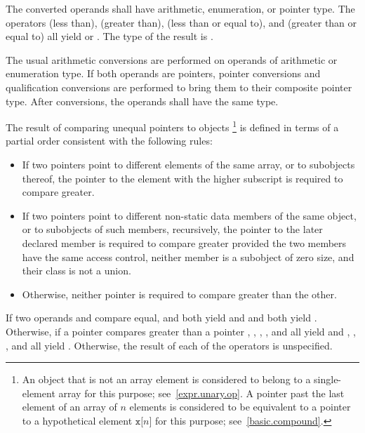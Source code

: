 \pnum
The converted operands shall have arithmetic, enumeration, or pointer type.
The
operators \tcode{<} (less than), \tcode{>} (greater than), \tcode{<=}
(less than or equal to), and \tcode{>=} (greater than or equal to) all
yield  or . The type of the result is
.

\pnum
The usual arithmetic conversions are performed on operands of arithmetic
or enumeration type. If both operands are pointers, pointer
conversions and qualification conversions
are performed to bring
them to their composite pointer type.
After conversions, the operands shall have the same type.

\pnum
The result of comparing unequal pointers to objects%
\footnote{An object that is not an array element is considered to belong to a
single-element array for this purpose; see~\ref{expr.unary.op}.
A pointer past the last element of an array  of $n$ elements
is considered to be equivalent to a pointer to a hypothetical element
$\mathtt{x[}n\mathtt{]}$ for this purpose; see~\ref{basic.compound}.}
is defined in terms of a partial order consistent with the following rules:

\begin{itemize}
\item If two pointers point to different elements of the same array, or to
subobjects thereof, the pointer to the element with the higher subscript
is required to compare greater.

\item If two pointers point to different non-static data members of the same
object, or to subobjects of such members, recursively,
the pointer to the later declared member is required to compare greater provided
the two members have the same access control,
neither member is a subobject of zero size,
and their class is not a union.

\item Otherwise, neither pointer is required to compare greater than the other.

\end{itemize}

\pnum
If two operands  and  compare equal,
 and  both yield  and  and
 both yield . Otherwise, if a pointer 
compares greater than a pointer , , ,
, and  all yield  and ,
, , and  all yield .
Otherwise, the result of each of the operators is unspecified.

